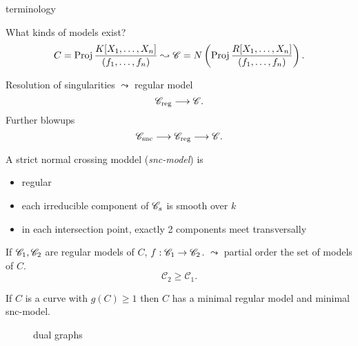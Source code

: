 \begin{frame}{terminology}
\begin{figure}[ht]
    \centering
\end{figure}
\end{frame}




\begin{frame}[t]
	What kinds of models exist?\[
		C = \operatorname{Proj} \frac{K[X_1, \ldots, X_n]}{(f_1, \ldots, f_n)}
		\leadsto \mathscr C = N\left(\operatorname{Proj} \frac{R[X_1, \ldots, X_n]}{(f_1, \ldots, f_n)}\right)
	.\] 
	\begin{minipage}{.49\textwidth}
	Resolution of singularities $\leadsto $ regular model 
	\[
		\mathscr C _\text{reg}  \longrightarrow \mathscr C 
	.\]
	\pause
	Further blowups \[
	\mathscr {\mathscr C}_\text{snc} \longrightarrow \mathscr {\mathscr C}_\text{reg} \longrightarrow \mathscr {\mathscr C}
	.\]
	\end{minipage}\;\;
	\begin{minipage}{.48\textwidth}
	\begin{definition}
		A strict normal crossing moddel (\emph{snc-model}) is
		\begin{itemize}
			\item regular
			\item each irreducible component of $\mathscr C_s$ is smooth over $k$
			\item in each intersection point, exactly 2 components meet transversally
		\end{itemize}
	\end{definition}
	\end{minipage}

\end{frame}

\begin{frame}
	If $\mathscr C_1, \mathscr C_2$ are regular models of $C$, $f: \mathscr C_1 \to \mathscr C_2$.
	$\leadsto$ partial order the set of models of $C$. 
	\[
	\mathscr C_2 \ge \mathscr C_1
	.\] 
\begin{theorem}
		If $C$ is a curve with $g(C) \ge 1$ then $C$ has a minimal regular model and minimal snc-model.
\end{theorem}
\end{frame}

\begin{frame}
\begin{figure}[ht]
    \centering
    \caption{dual graphs}
    \label{fig:dual-graphs}
\end{figure}
\end{frame}



